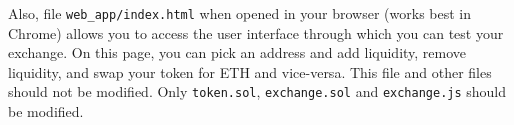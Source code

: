 \documentclass[11pt]{article}
\begin{document}
Also, file \texttt{web\_app/index.html} when opened in your browser (works best in Chrome) allows you to access the user interface through which you can test your exchange. On this page, you can pick an address and add liquidity, remove liquidity, and swap your token for ETH and vice-versa. This file and other files should not be modified. Only \texttt{token.sol}, \texttt{exchange.sol} and \texttt{exchange.js} should be modified.

\begin{comment}
\section{Getting Started}
\begin{enumerate}
\textbf{TODO: CHANGE TO SETUP USING HARDHAT \newline}
\item If you haven't done so for the previous project, you'll need to download and install Node.js from \url{https://nodejs.org/en/}. Choose the LTS version (the one on the left).

\item If you haven't done so for the previous project, run \verb|npm install -g ganache-cli| to install the Ganache CLI, which we will use to simulate a real Ethereum node on our local machines. Then, run \verb|ganache-cli| to run the node. You can stop the node at anytime with Ctrl-C.

\item Download the starter code from the class website and open it in your favorite IDE or text editor (something like Sublime Text, Atom, or Visual Studio Code works nicely). Familiarize yourself with the code base. For this project, you are expected to fill in the \texttt{exchange.sol} and \texttt{exchange.js} files. You may add helper functions to these two files if needed. 

\item Open \url{https://remix.ethereum.org} in your web browser. In the `Deploy \& Run Transactions' tab, set the environment to `Web3 Provider', click `Ok' when prompted, and then set the `Web3 Provider Endpoint' to \verb|http://localhost:8545| - this should be the default. This is where you will develop your smart contract (which you will write in Solidity). In the `Solidity Compiler' tab, set the compiler to version 0.8.0+.

\item Under the "File explorers" tab on Remix, click the upload icon underneath "default\_workspace." Upload the entire \texttt{contracts}, \texttt{interfaces}, and \texttt{libraries} directories from the starter code. After uploading, you should see the \texttt{contracts/exchange.sol}, \texttt{contracts/token.sol}, \\ \texttt{libraries/safe\_math.sol}, and \texttt{interfaces/erc20\_interface.sol} files in your Remix "File explorers" tab.


\end{comment}
\end{document}
